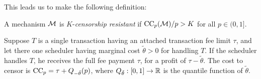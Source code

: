 This leads us to make the following definition:
%
\begin{definition}

  A mechanism $\mathcal{M}$ is $K$-\emph{censorship resistant} if $\mathrm{CC}_{p}(\mathcal{M})/p>K$ for all $p\in(0,1]$.

\end{definition}

\begin{example}

  Suppose $T$ is a single transaction having an attached transaction fee limit $\tau$, and let there one scheduler having marginal cost $\tilde{\theta}>0$ for handling $T$.
  If the scheduler handles $T$, he receives the full fee payment $\tau$, for a profit of $\tau-\tilde{\theta}$.
  The cost to censor is $\mathrm{CC}_{p}=\tau+Q_{-\tilde{\theta}}(p)$, where $Q_{\tilde{\theta}}:[0,1]\rightarrow\mathbb{R}$ is the quantile function of $\tilde{\theta}$.

\end{example}



